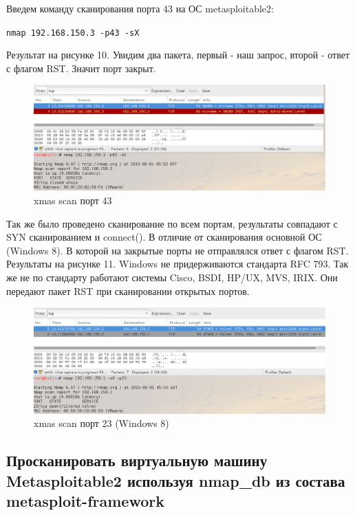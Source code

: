 \documentclass[11pt, a4paper]{article}		%
\begin{document}
Введем команду сканирования порта 43 на ОС metasploitable2: 

\verb'nmap 192.168.150.3 -p43 -sX'

Результат на рисунке 10. Увидим два пакета, первый - наш запрос, второй - ответ с флагом RST. Значит порт закрыт.

\begin{figure}[h!]
\centering
\includegraphics[scale=0.8]{res/xmas_scan_43}
\caption{xmas scan порт 43}
\end{figure}

Так же было проведено сканирование по всем портам, результаты совпадают с SYN сканированием и connect(). В отличие от сканирования основной ОС (Windows 8). В которой на закрытые порты не отправлялся ответ с флагом RST. Результаты на рисунке 11. Windows не придерживаются стандарта RFC 793. Так же не по стандарту работают системы Cisco, BSDI, HP/UX, MVS, IRIX. Они передают пакет RST при сканировании открытых портов.

\begin{figure}[h!]
\centering
\includegraphics[scale=0.8]{res/xmas_scan_23}
\caption{xmas scan порт 23 (Windows 8)}
\end{figure}



\subsection{Просканировать виртуальную машину Metasploitable2 используя nmap\_db из состава metasploit-framework}
\end{document}
